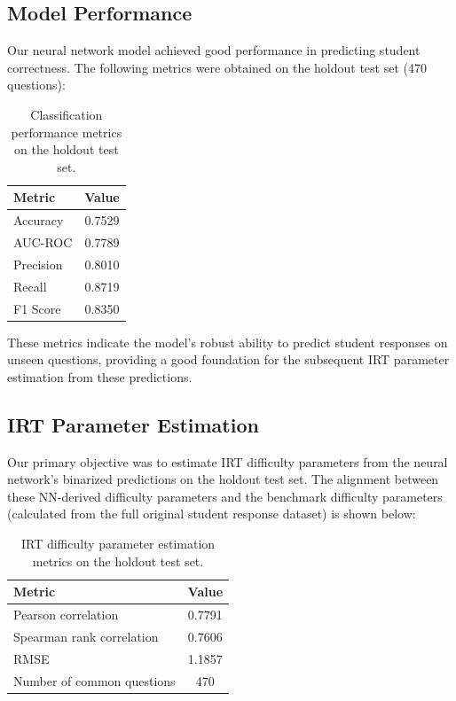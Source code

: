 \documentclass[
    a4paper, %
    10pt, %
    twoside, %
]{LTJournalArticle}
\begin{document}
\subsection{Model Performance}

Our neural network model achieved good performance in predicting student correctness. The following metrics were obtained on the holdout test set (470 questions):

\begin{table}[H]
    \centering
    \begin{tabular}{lc}
        \hline
        \textbf{Metric} & \textbf{Value} \\
        \hline
        Accuracy & 0.7529 \\
        AUC-ROC & 0.7789 \\
        Precision & 0.8010 \\
        Recall & 0.8719 \\
        F1 Score & 0.8350 \\
        \hline
    \end{tabular}
    \caption{Classification performance metrics on the holdout test set.}
    \label{tab:classification-metrics-test}
\end{table}

These metrics indicate the model's robust ability to predict student responses on unseen questions, providing a good foundation for the subsequent IRT parameter estimation from these predictions.

\subsection{IRT Parameter Estimation}

Our primary objective was to estimate IRT difficulty parameters from the neural network's binarized predictions on the holdout test set. The alignment between these NN-derived difficulty parameters and the benchmark difficulty parameters (calculated from the full original student response dataset) is shown below:

\begin{table}[H]
    \centering
    \begin{tabular}{lc}
        \hline
        \textbf{Metric} & \textbf{Value} \\
        \hline
        Pearson correlation & 0.7791 \\
        Spearman rank correlation & 0.7606 \\
        RMSE & 1.1857 \\
        Number of common questions & 470 \\
        \hline
    \end{tabular}
    \caption{IRT difficulty parameter estimation metrics on the holdout test set.}
    \label{tab:irt-metrics-1pl}
\end{table}
\end{document}
